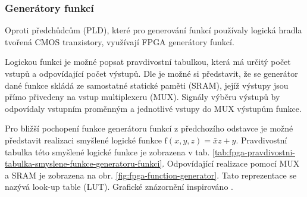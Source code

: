 \documentclass[a4paper, twoside, 11pt]{article}
\begin{document}
		\subsubsection{Generátory funkcí}\label{subsubsec:generatory-funkci}
		Oproti předchůdcům (PLD), které pro generování funkcí používaly logická hradla tvořená CMOS tranzistory, využívají FPGA generátory funkcí.\par
		Logickou funkci je možné popsat pravdivostní tabulkou, která má určitý počet vstupů a odpovídající počet výstupů. Dle \cite{Sass2010} je možné si představit, že se generátor dané funkce skládá ze samostatné statické paměti (SRAM), jejíž výstupy jsou přímo přivedeny na vstup multiplexeru (MUX). Signály výběru výstupů by odpovídaly vstupním proměnným a jednotlivé vstupy do MUX výstupům funkce.\par
		Pro bližší pochopení funkce generátoru funkcí z předchozího odstavce je možné představit realizaci smyšlené logické funkce $\text{f} (x, y, z) = \bar{x}z + y$. Pravdivostní tabulka této smyšlené logické funkce je zobrazena v tab. \ref{tab:fpga-pravdivostni-tabulka-smyslene-funkce-generatoru-funkci}. Odpovídající realizace pomocí MUX a SRAM je zobrazena na obr. \ref{fig:fpga-function-generator}. Tato reprezentace se nazývá look-up table (LUT). Grafické znázornění inspirováno \cite{Sass2010}.
		
\end{document}
